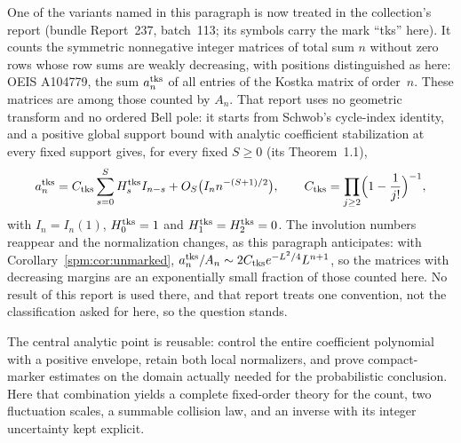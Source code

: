 \begin{writenote}
One of the variants named in this paragraph is now treated in the
collection's report  (bundle Report~237,
batch~113; its symbols carry the mark ``tks'' here). It counts the
symmetric nonnegative integer matrices of total sum $n$ without zero rows
whose row sums are weakly decreasing, with positions distinguished as here:
OEIS A104779, the sum $a^{\rm tks}_n$ of all entries of the Kostka matrix of
order~$n$. These matrices are among those counted by $A_n$. That report
uses no geometric transform and no ordered Bell pole: it starts from
Schwob's cycle-index identity, and a positive global support bound with
analytic coefficient stabilization at every fixed support gives, for every
fixed $S\ge0$ (its Theorem~1.1),
\[
 a^{\rm tks}_n=C_{\rm tks}\sum_{s=0}^{S}H^{\rm tks}_sI_{n-s}
 +O_S\bigl(I_nn^{-(S+1)/2}\bigr),\qquad
 C_{\rm tks}=\prod_{j\ge2}\Bigl(1-\frac1{j!}\Bigr)^{-1},
\]
with $I_n=I_n(1)$, $H^{\rm tks}_0=1$ and $H^{\rm tks}_1=H^{\rm tks}_2=0$.
The involution numbers reappear and the normalization changes, as this
paragraph anticipates: with Corollary~\ref{spm:cor:unmarked},
$a^{\rm tks}_n/A_n\sim2C_{\rm tks}e^{-L^2/4}L^{n+1}$, so the matrices with
decreasing margins are an exponentially small fraction of those counted
here. No result of this report is used there, and that report treats one
convention, not the classification asked for here, so the question stands.
\end{writenote}

The central analytic point is reusable: control the entire coefficient polynomial with a positive envelope, retain both local normalizers, and prove compact-marker estimates on the domain actually needed for the probabilistic conclusion. Here that combination yields a complete fixed-order theory for the count, two fluctuation scales, a summable collision law, and an inverse with its integer uncertainty kept explicit.

